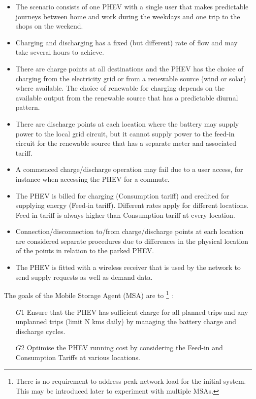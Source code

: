 \documentclass[a4paper]{article}
\begin{document}
\begin{itemize}

\item The scenario consists of one PHEV with a single user that makes predictable journeys between home and work during the weekdays and one trip to the shops on the weekend.

\item Charging and discharging has a fixed (but different) rate of flow and may take several hours to achieve.

\item There are charge points at all destinations and the PHEV has the choice of charging from the electricity grid or from a renewable source (wind or solar) where available. The choice of renewable for charging depends on the available output from the renewable source that has a predictable diurnal pattern.

\item There are discharge points at each location where the battery may supply power to the local grid circuit, but it cannot supply power to the feed-in circuit for the renewable source that has a separate meter and associated tariff.

\item A commenced charge/discharge operation may fail due to a user access, for instance when accessing the PHEV for a commute.

\item The PHEV is billed for charging (Consumption tariff) and credited for supplying energy (Feed-in tariff). Different rates apply for different locations. Feed-in tariff is always higher than Consumption tariff at every location.

\item Connection/disconnection to/from charge/discharge points at each location are considered separate procedures due to differences in the physical location of the points in relation to the parked PHEV.

\item The PHEV is fitted with a wireless receiver that is used by the network to send supply requests as well as demand data.



\end{itemize}

The goals of the Mobile Storage Agent (MSA) are to \footnote{There is no requirement to address peak network load for the initial system. This may be introduced later to experiment with multiple MSAs.}
:
\begin{enumerate}
\item[$G1$] Ensure that the PHEV has sufficient charge for all planned trips and any unplanned trips (limit N kms daily) by managing the battery charge and discharge cycles.
\item[$G2$] Optimise the PHEV running cost by considering the Feed-in and Consumption Tariffs at various locations.
\end{enumerate}
\end{document}
